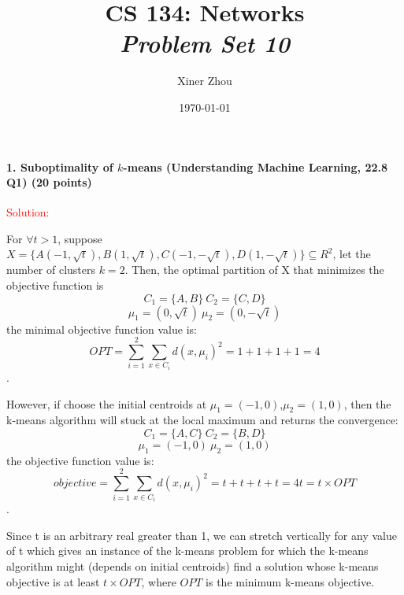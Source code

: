 \documentclass[11pt]{article} %
\title{CS 134: Networks \\ \emph{Problem Set 10}}
\author{Xiner Zhou}
\date{\today} %
\begin{document}
 
\maketitle

\paragraph{1. Suboptimality of $k$-means (Understanding Machine Learning, 22.8 Q1) (20 points)}

\textcolor{red}{Solution:} 
\begin{center}
\end{center}

For $\forall t>1$, suppose $X =\{ A(-1, \sqrt{t}), B(1, \sqrt{t}), C(-1, -\sqrt{t}), D(1, -\sqrt{t}) \} \subseteq R^2$, let the number of clusters $k=2$. Then, the optimal partition of X that minimizes the objective function is 
$$C_1=\{A,B\} \ C_2=\{C,D\}$$
$$\mu_1=(0, \sqrt{t}) \ \mu_2=(0, -\sqrt{t})$$
the minimal objective function value is: 
$$OPT=\sum_{i=1}^{2} \sum_{x \in C_i} d(x, \mu_i)^2=1+1+1+1=4$$.

However, if choose the initial centroids at $\mu_1=(-1, 0)$,$\mu_2=(1, 0)$, then the k-means algorithm will stuck at the local maximum and returns the convergence: 
$$C_1=\{A,C\} \ C_2=\{B,D\}$$
$$\mu_1=(-1, 0) \ \mu_2=(1, 0)$$
the objective function value is: 
$$objective=\sum_{i=1}^{2} \sum_{x \in C_i} d(x, \mu_i)^2=t+t+t+t=4t=t \times OPT$$.

Since t is an arbitrary real greater than 1, we can stretch vertically for any value of t which gives an instance of the k-means problem for which the k-means algorithm might (depends on initial centroids) find a solution whose k-means objective is at least $t \times OPT$, where $OPT$ is the minimum k-means objective.
 
\end{document}
